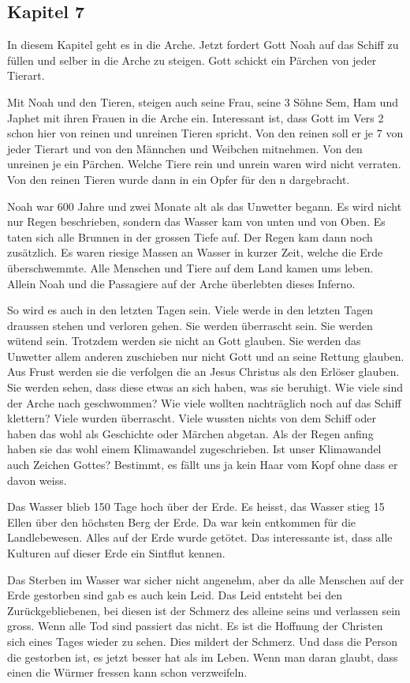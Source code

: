 \subsection{Kapitel 7}
In diesem Kapitel geht es in die Arche. Jetzt fordert Gott Noah auf das Schiff zu füllen und selber in die Arche zu steigen. Gott schickt ein Pärchen von jeder Tierart.

Mit Noah und den Tieren, steigen auch seine Frau, seine 3 Söhne Sem, Ham und Japhet mit ihren Frauen in die Arche ein. Interessant ist, dass Gott im Vers 2 schon hier von reinen und unreinen Tieren spricht. Von den reinen soll er je 7 von jeder Tierart und von den Männchen und Weibchen mitnehmen. Von den unreinen je ein Pärchen. Welche Tiere rein und unrein waren wird nicht verraten. Von den reinen Tieren wurde dann in  ein Opfer für den \herr n dargebracht.

Noah war 600 Jahre und zwei Monate alt als das Unwetter begann. Es wird nicht nur Regen beschrieben, sondern das Wasser kam von unten und von Oben. Es taten sich alle Brunnen in der grossen Tiefe auf. Der Regen kam dann noch zusätzlich. Es waren riesige Massen an Wasser in kurzer Zeit, welche die Erde überschwemmte. Alle Menschen und Tiere auf dem Land kamen ums leben. Allein Noah und die Passagiere auf der Arche überlebten dieses Inferno.

So wird es auch in den letzten Tagen sein. Viele werde in den letzten Tagen draussen stehen und verloren gehen. Sie werden überrascht sein. Sie werden wütend sein. Trotzdem werden sie nicht an Gott glauben. Sie werden das Unwetter allem anderen zuschieben nur nicht Gott und an seine Rettung glauben. Aus Frust werden sie die verfolgen die an Jesus Christus als den Erlöser glauben. Sie werden sehen, dass diese etwas an sich haben, was sie beruhigt. Wie viele sind der Arche nach geschwommen? Wie viele wollten nachträglich noch auf das Schiff klettern? Viele wurden überrascht. Viele wussten nichts von dem Schiff oder haben das wohl als Geschichte oder Märchen abgetan. Als der Regen anfing haben sie das wohl einem Klimawandel zugeschrieben. Ist unser Klimawandel auch Zeichen Gottes? Bestimmt, es fällt uns ja kein Haar vom Kopf ohne dass er davon weiss.

Das Wasser blieb 150 Tage hoch über der Erde. Es heisst, das Wasser stieg 15 Ellen über den höchsten Berg der Erde. Da war kein entkommen für die Landlebewesen. Alles auf der Erde wurde getötet. Das interessante ist, dass alle Kulturen auf dieser Erde ein Sintflut kennen.

Das Sterben im Wasser war sicher nicht angenehm, aber da alle Menschen auf der Erde gestorben sind gab es auch kein Leid. Das Leid entsteht bei den Zurückgebliebenen, bei diesen ist der Schmerz des alleine seins und verlassen sein gross. Wenn alle Tod sind passiert das nicht. Es ist die Hoffnung der Christen sich eines Tages wieder zu sehen. Dies mildert der Schmerz. Und dass die Person die gestorben ist, es jetzt besser hat als im Leben. Wenn man daran glaubt, dass einen die Würmer fressen kann schon verzweifeln.